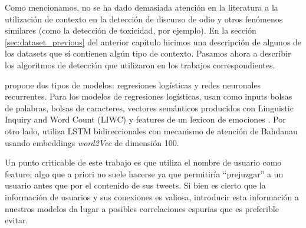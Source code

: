 Como mencionamos, no se ha dado demasiada atención en la literatura a la utilización de contexto en la detección de discurso de odio y otros fenómenos similares (como la detección de toxicidad, por ejemplo). En la sección \ref{sec:dataset_previous} del anterior capítulo hicimos una descripción de algunos de los datasets que sí contienen algún tipo de contexto. Pasamos ahora a describir los algoritmos de detección que utilizaron en los trabajos correspondientes.

\citet{gao-huang-2017-detecting} propone dos tipos de modelos: regresiones logísticas y redes neuronales recurrentes. Para los modelos de regresiones logísticas, usan como inputs bolsas de palabras, bolsas de caracteres, vectores semánticos producidos con Linguistic Inquiry and Word Count (LIWC) \cite{pennebaker2001linguistic} y features de un lexicon de emociones \cite{mohammad2013nrc}. Por otro lado, utiliza LSTM bidireccionales con mecanismo de atención de Bahdanau \cite{bahdanau2014neural} usando embeddings \emph{word2Vec} de dimensión 100.

Un punto criticable de este trabajo es que utiliza el nombre de usuario como feature; algo que a priori no suele hacerse ya que permitiría ``prejuzgar'' a un usuario antes que por el contenido de sus tweets. Si bien es cierto que la información de usuarios y sus conexiones es valiosa, introducir esta información a nuestros modelos da lugar a posibles correlaciones espurias que es preferible evitar.


